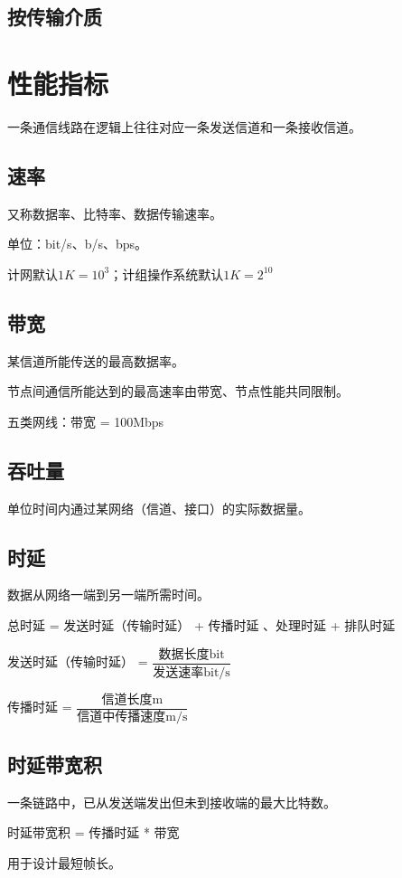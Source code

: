 \subsection{按传输介质}


\section{性能指标}
一条通信线路在逻辑上往往对应一条发送信道和一条接收信道。

\subsection{速率}
又称数据率、比特率、数据传输速率。

单位：bit/s、b/s、bps。

计网默认\(1K = 10^3\)；计组操作系统默认\(1K = 2^{10}\)



\subsection{带宽}
某信道所能传送的最高数据率。

节点间通信所能达到的最高速率由带宽、节点性能共同限制。

五类网线：带宽 = 100Mbps


\subsection{吞吐量}
单位时间内通过某网络（信道、接口）的实际数据量。


\subsection{时延}
数据从网络一端到另一端所需时间。

总时延 = 发送时延（传输时延） + 传播时延 、处理时延 + 排队时延

发送时延（传输时延） = \(\dfrac{\text{数据长度bit}}{\text{发送速率bit/s}}\)

传播时延 = \(\dfrac{\text{信道长度m}}{\text{信道中传播速度m/s}}\)


\subsection{时延带宽积}
一条链路中，已从发送端发出但未到接收端的最大比特数。

时延带宽积 = 传播时延 * 带宽

用于设计最短帧长。



